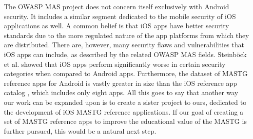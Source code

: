The OWASP MAS project does not concern itself exclusively with Android security. It includes a similar segment dedicated to the mobile security of iOS applications as well. A common belief is that iOS apps have better security standards due to the more regulated nature of the app platforms from which they are distributed. There are, however, many security flaws and vulnerabilities that iOS apps can include, as described by the related OWASP MAS fields. Steinböck et al. \cite{paper_22} showed that iOS apps perform significantly worse in certain security categories when compared to Android apps. Furthermore, the dataset of MASTG reference apps for Android \cite{mastg_repo_apps_overview} is vastly greater in size than the iOS reference app catalog \cite{mastg_repo_iOS_apps_overview}, which includes only eight apps. All this goes to say that another way our work can be expanded upon is to create a sister project to ours, dedicated to the development of iOS MASTG reference applications. If our goal of creating a set of MASTG reference apps to improve the educational value of the MASTG is further pursued, this would be a natural next step.